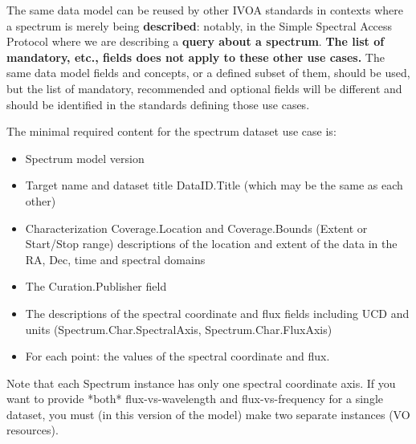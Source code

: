 \documentclass[11pt]{article}
\begin{document}
The same data model can be reused by other IVOA standards in contexts where a spectrum is
merely being {\bf described}: notably, in the Simple Spectral Access
Protocol where we are describing a {\bf query about a spectrum}. {\bf
The list of mandatory, etc., fields does not apply to these other use cases.}
The same data model fields and concepts, or a
defined subset of them, should be used, but the list of mandatory,
recommended and optional fields will be different and should be
identified in the standards defining those use cases.

The minimal required content for the spectrum dataset use case is:

\begin{itemize}
\item Spectrum model version
\item Target name and dataset title DataID.Title (which may be the same as each other)
\item  Characterization Coverage.Location and Coverage.Bounds (Extent or Start/Stop range) descriptions
       of the location and extent of the data in the RA, Dec, time and spectral domains
\item  The Curation.Publisher field
\item  The descriptions of the spectral coordinate and flux
fields including UCD and units  (Spectrum.Char.SpectralAxis, Spectrum.Char.FluxAxis)
\item  For each point: the values of the spectral coordinate and flux.
\end{itemize}

Note that each Spectrum instance has only one spectral coordinate axis.
If you want to provide *both* flux-vs-wavelength and flux-vs-frequency
for a single dataset, you must (in this version of the model)
make two separate instances (VO resources).
\end{document}
